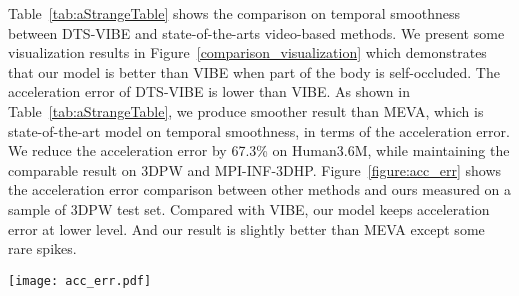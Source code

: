 \documentclass[10pt,twocolumn,letterpaper]{article}
\begin{document}
Table~\ref{tab:aStrangeTable} shows the comparison on temporal smoothness between DTS-VIBE and state-of-the-arts video-based methods. We present some visualization results in Figure~\ref{comparison_visualization} which demonstrates that our model is better than VIBE when part of the body is self-occluded. The acceleration error of DTS-VIBE is lower than VIBE. As shown in Table~\ref{tab:aStrangeTable}, we produce smoother result than MEVA, which is state-of-the-art model on temporal smoothness, in terms of the acceleration error. We reduce the acceleration error by 67.3\% on Human3.6M, while maintaining the comparable result on 3DPW and MPI-INF-3DHP. Figure~\ref{figure:acc_err} shows the acceleration error comparison between other methods and ours measured on a sample of 3DPW test set. Compared with VIBE, our model keeps acceleration error at lower level. And our result is slightly better than MEVA except some rare spikes.
\begin{table}[t]
\centering
{}
\caption{\textbf{Ablation study on transformer.} We replace our transformer encoder (TE) with GRU and replace Transformer Regressor with HMR regressor}
\label{tab:ablation_transformer}
\end{table}

\begin{table}[t]
\centering
{}
\caption{\textbf{Ablation study on flow.} We conduct experiments that removes flow feature and flow loss from our model.}
\label{tab:ablation_flow}
\end{table}

\begin{figure*}[t]
\centering
\texttt{[image: acc\_err.pdf]}
\caption{\textbf{Comparison of acceleration errors between VIBE, MEVA and our method.} The top of the figure shows some samples from test images and the bottom graph is the acceleration error along the timeline for three models. Overall, our result is slightly smoother than MEVA and significantly better than VIBE.}
\label{figure:acc_err}
\end{figure*}
\end{document}
